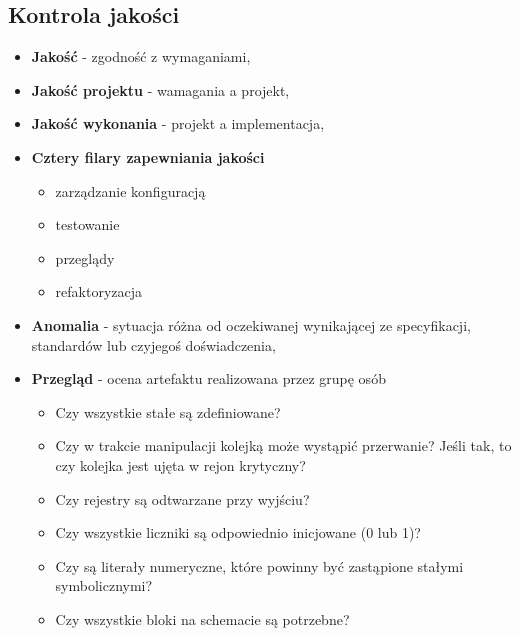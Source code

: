 \documentclass[../main.tex]{subfiles}
\begin{document}
    \subsection{Kontrola jakości}


    \begin{itemize}
        \item \textbf{Jakość} - zgodność z wymaganiami,
        \item \textbf{Jakość projektu} - wamagania a projekt,
        \item \textbf{Jakość wykonania} - projekt a implementacja,
        \item \textbf{Cztery filary zapewniania jakości}
        \begin{itemize}
            \item zarządzanie konfiguracją
            \item testowanie
            \item przeglądy
            \item refaktoryzacja
        \end{itemize}
        \item \textbf{Anomalia} - sytuacja różna od oczekiwanej wynikającej ze specyfikacji, standardów lub
        czyjegoś doświadczenia,
        \item \textbf{Przegląd} - ocena artefaktu realizowana przez grupę osób
        \begin{itemize}
            \item Czy wszystkie stałe są zdefiniowane?
            \item Czy w trakcie manipulacji kolejką może wystąpić przerwanie? Jeśli tak, to czy kolejka jest
            ujęta w rejon krytyczny?
            \item Czy rejestry są odtwarzane przy wyjściu?
            \item Czy wszystkie liczniki są odpowiednio inicjowane (0 lub 1)?
            \item Czy są literały numeryczne, które powinny być zastąpione stałymi symbolicznymi?
            \item Czy wszystkie bloki na schemacie są potrzebne?
        \end{itemize}
    \end{itemize}
\end{document}
